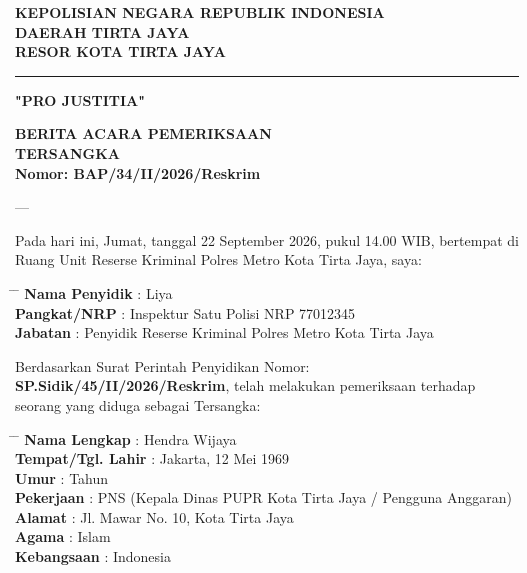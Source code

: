 \documentclass[12pt,a4paper]{article}
\begin{document}
\begin{flushleft}
    {\large \textbf{KEPOLISIAN NEGARA REPUBLIK INDONESIA}} \\
    {\large \textbf{DAERAH TIRTA JAYA }} \\
    {\large \textbf{RESOR KOTA TIRTA JAYA}}
    \rule{\textwidth}{1.5pt}
    \vspace{0.3cm}
    {\textbf {"PRO JUSTITIA"}}
\end{flushleft}
    
\begin{center}
    {\large \textbf{BERITA ACARA PEMERIKSAAN}}\\
    {\large \textbf{TERSANGKA}} \\
    \textbf{Nomor: BAP/34/II/2026/Reskrim}
    \vspace{0.3cm}
\end{center}

---

Pada hari ini, Jumat, tanggal 22 September 2026, pukul 14.00 WIB, bertempat di Ruang Unit Reserse Kriminal Polres Metro Kota Tirta Jaya, saya:
\begin{tabbing}
    \hspace{3cm} \= \hspace{1cm} \= \kill
    \textbf{Nama Penyidik} \> : \> Liya \\
    \textbf{Pangkat/NRP} \> : \> Inspektur Satu Polisi NRP 77012345 \\
    \textbf{Jabatan} \> : \> Penyidik Reserse Kriminal Polres Metro Kota Tirta Jaya
\end{tabbing}

Berdasarkan Surat Perintah Penyidikan Nomor: \textbf{SP.Sidik/45/II/2026/Reskrim}, telah melakukan pemeriksaan terhadap seorang yang diduga sebagai Tersangka:
\begin{tabbing}
    \hspace{3cm} \= \hspace{1cm} \= \kill
    \textbf{Nama Lengkap} \> : \> Hendra Wijaya \\
    \textbf{Tempat/Tgl. Lahir} \> : \> Jakarta, 12 Mei 1969 \\
    \textbf{Umur} \> :  Tahun \\
    \textbf{Pekerjaan} \> : \> PNS (Kepala Dinas PUPR Kota Tirta Jaya / Pengguna Anggaran) \\
    \textbf{Alamat} \> : \> Jl. Mawar No. 10, Kota Tirta Jaya \\
    \textbf{Agama} \> : \> Islam \\
    \textbf{Kebangsaan} \> : \> Indonesia
\end{tabbing}
\end{document}

